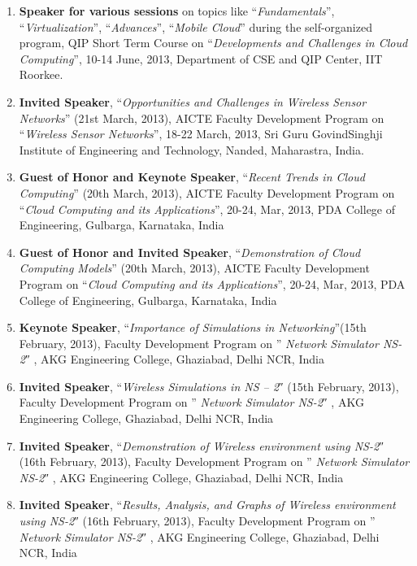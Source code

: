 \begin{enumerate} [label=(T\arabic*).]
\item
\textbf{Speaker for various sessions} on topics like “\textit{Fundamentals}”, “\textit{Virtualization}”, “\textit{Advances}”, “\textit{Mobile Cloud}” during the self-organized program, QIP Short Term Course on “\textit{Developments and Challenges in Cloud Computing}”, 10-14 June, 2013, Department of CSE and QIP Center, IIT Roorkee.

\item
\textbf{Invited Speaker}, “\textit{Opportunities and Challenges in Wireless Sensor Networks}” (21st March, 2013), AICTE Faculty Development Program on “\textit{Wireless Sensor Networks}”, 18-22 March, 2013, Sri Guru GovindSinghji Institute of Engineering and Technology, Nanded, Maharastra, India.

\item
\textbf{Guest of Honor and Keynote Speaker}, “\textit{Recent Trends in Cloud Computing}” (20th March, 2013), AICTE Faculty Development Program on “\textit{Cloud Computing and its Applications}”, 20-24, Mar, 2013, PDA College of Engineering, Gulbarga, Karnataka, India

\item
\textbf{Guest of Honor and Invited Speaker}, “\textit{Demonstration of Cloud Computing Models}” (20th March, 2013), AICTE Faculty Development Program on “\textit{Cloud Computing and its Applications}”, 20-24, Mar, 2013, PDA College of Engineering, Gulbarga, Karnataka, India

\item
\textbf{Keynote Speaker}, “\textit{Importance of Simulations in Networking}”(15th February, 2013), Faculty Development Program on ” \textit{Network Simulator NS-2}″ , AKG Engineering College, Ghaziabad, Delhi NCR, India

\item
\textbf{Invited Speaker}, “\textit{Wireless Simulations in NS – 2}″ (15th February, 2013), Faculty Development Program on ” \textit{Network Simulator NS-2}″ , AKG Engineering College, Ghaziabad, Delhi NCR, India

\item
\textbf{Invited Speaker}, “\textit{Demonstration of Wireless environment using NS-2}″ (16th February, 2013), Faculty Development Program on ” \textit{Network Simulator NS-2}″ , AKG Engineering College, Ghaziabad, Delhi NCR, India

\item
\textbf{Invited Speaker}, “\textit{Results, Analysis, and Graphs of Wireless environment using NS-2}″ (16th February, 2013), Faculty Development Program on ” \textit{Network Simulator NS-2}″ , AKG Engineering College, Ghaziabad, Delhi NCR, India


\end{enumerate}
